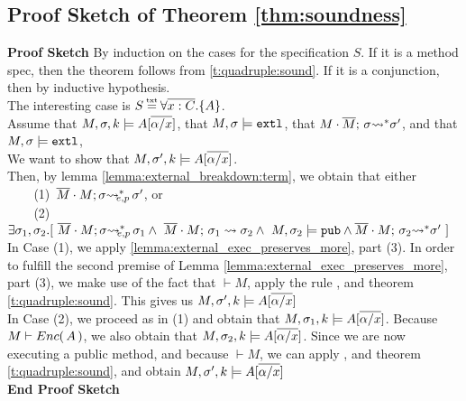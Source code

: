 \subsection{Proof Sketch of Theorem  \ref{thm:soundness}}

\label{s:app:proof:sketch;overall}
 {\textbf{Proof Sketch}}
 By induction on the  cases for the specification $S$. If it is a method spec, then the theorem follows from \ref{t:quadruple:sound}. If it is a conjunction, then by inductive hypothesis.
 \\
 The interesting case is $S \txteq {\TwoStatesN {\overline {x:C}} {A}}$.
 \\
 Assume that 
 $ M,\sigma ,{k} \models {A} [\overline {\alpha/x} ]$, that  $M,\sigma \models \mbox{\normalfont{\texttt{extl}}}$,
 that $M\cdot \overline{M};\, {\sigma} {\rightsquigarrow^*} \sigma'$, and that $M,\sigma \models \mbox{\normalfont{\texttt{extl}}}$,
 \\ 
 We want to show that $ M,\sigma' ,{k} \models {A} [\overline {\alpha/x} ]$.
 \\
 Then, by lemma
 \ref{lemma:external_breakdown:term}, we obtain that either \\
$\strut \ \ \ \ \ $ (1)\  $\overline{M}\cdot M; \sigma {\rightsquigarrow^*}\!\!\!\!_{e,p}\, \sigma'$, or\\
$\strut \ \ \ \ \ $  (2)\  $\exists \sigma_1,\sigma_2.[\
\leadstoBoundedExtPub {\Mtwo\cdot M}    {\sigma}  {\sigma_1}
\wedge\ \leadstoBounded  {\Mtwo\cdot M}    {\sigma_1}  {\sigma_2}
\wedge \ M, \sigma_2 \models \pubMeth \wedge \leadstoBoundedStar  {\Mtwo\cdot M}    {\sigma_2}  {\sigma'} \ ]$
\\
In Case (1), we apply  \ref{lemma:external_exec_preserves_more}, part (3).  In order to fulfill the second premise of Lemma  \ref{lemma:external_exec_preserves_more}, part (3), we make use of the fact that $\vdash M$,   apply the rule {}, and theorem \ref{t:quadruple:sound}.
This gives us $ M,\sigma' ,{k} \models {A} [\overline {\alpha/x} ]$
\\
In Case (2), we proceed as in (1) and obtain that $ M,\sigma_1 ,{k} \models {A} [\overline {\alpha/x} ]$. Because $M \vdash {\ensuremath Enc(\, A\, )}$, we also obtain that 
$ M,\sigma_2 ,{k} \models {A} [\overline {\alpha/x} ]$.
Since we are now executing a public method, and because $\vdash M$, we can apply {}, and theorem \ref{t:quadruple:sound}, and obtain $ M,\sigma' ,{k} \models {A} [\overline {\alpha/x} ]$\\
 \vspace{.1cm}
  {\textbf{End Proof Sketch}} 
